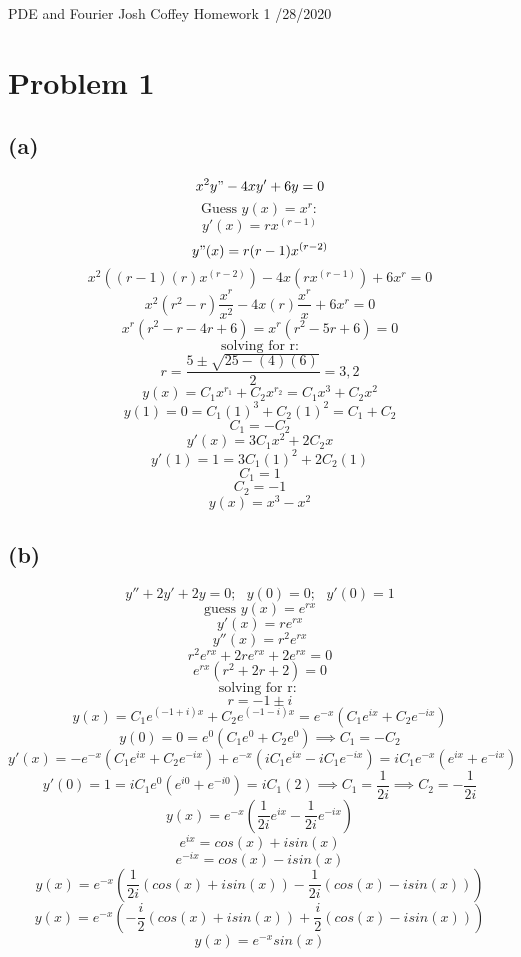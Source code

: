 \documentclass[preview,12pt]{article}
\begin{document}
\noindent PDE and Fourier\newline
Josh Coffey \newline
Homework 1 /28/2020 \newline

\section*{Problem 1}
    \subsection*{(a)}
        $$x^2y"-4xy'+6y=0$$
        $$\textrm{Guess } y(x)=x^r:$$
        $$y'(x)=rx^{(r-1)}$$
        $$y"(x)=r(r-1)x^{(r-2)}$$
        $$x^2((r-1)(r)x^{(r-2)})-4x(rx^{(r-1)})+6x^r=0$$
        $$x^2(r^2-r)\frac{x^r}{x^2}-4x(r)\frac{x^r}{x}+6x^r=0$$
        $$x^r(r^2-r-4r+6)=x^r(r^2-5r+6)=0$$
        $$\textrm{solving for r:}$$
        $$r=\frac{5 \pm{} \sqrt{25-(4)(6)}}{2}=3,2$$
        $$y(x)=C_1x^{r_1}+C_2x^{r_2}=C_1x^{3}+C_2x^{2}$$
        $$y(1)=0=C_1(1)^{3}+C_2(1)^{2}=C_1+C_2$$
        $$C_1=-C_2$$
        $$y'(x)=3C_1x^2+2C_2x$$
        $$y'(1)=1=3C_1(1)^2+2C_2(1)$$
        $$C_1=1$$
        $$C_2=-1$$
        $$y(x)=x^3-x^2$$
    \subsection*{(b)}
        $$y''+2y'+2y=0; \textrm{  }y(0)=0;\textrm{  } y'(0)=1$$
        $$\textrm{guess } y(x)=e^{rx}$$
        $$y'(x)=re^{rx}$$
        $$y''(x)=r^2e^{rx}$$
        $$r^2e^{rx}+2re^{rx}+2e^{rx}=0$$
        $$e^{rx}(r^2+2r+2)=0$$
        $$\textrm{solving for r: }$$
        $$r=-1\pm{}i$$
        $$y(x)=C_1e^{(-1+i)x}+C_2e^{(-1-i)x}=e^{-x}(C_1e^{ix}+C_2e^{-ix})$$
        $$y(0)=0=e^{0}(C_1e^{0}+C_2e^{0}) \implies C_1=-C_2$$
        $$y'(x)=-e^{-x}(C_1e^{ix}+C_2e^{-ix})+e^{-x}(iC_1e^{ix}-iC_1e^{-ix})=iC_1e^{-x}(e^{ix}+e^{-ix})$$
        $$y'(0)=1=iC_1e^{0}(e^{i0}+e^{-i0})=iC_1(2) \implies C_1=\frac{1}{2i} \implies C_2=-\frac{1}{2i}$$
        $$y(x)=e^{-x}(\frac{1}{2i}e^{ix}-\frac{1}{2i}e^{-ix})$$
        $$e^{ix}=cos(x)+isin(x)$$
        $$e^{-ix}=cos(x)-isin(x)$$
        $$y(x)=e^{-x}(\frac{1}{2i}(cos(x)+isin(x))-\frac{1}{2i}(cos(x)-isin(x)))$$
        $$y(x)=e^{-x}(-\frac{i}{2}(cos(x)+isin(x))+\frac{i}{2}(cos(x)-isin(x)))$$
        $$y(x)=e^{-x}sin(x)$$
\end{document}
